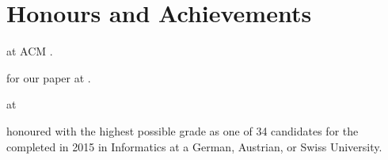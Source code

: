 \section{Honours and Achievements}
\begin{cvitemize}
    \item {} at ACM .
    \item {} for our paper at .
    \item {} at
        \begin{inlineItemize}
        \item {}
        \item {}
        \item {}
        \end{inlineItemize}
    \item {} honoured with the highest possible grade \newline
           as one of 34 candidates for the  completed in 2015 in Informatics at a German, Austrian, or Swiss University.
\end{cvitemize}